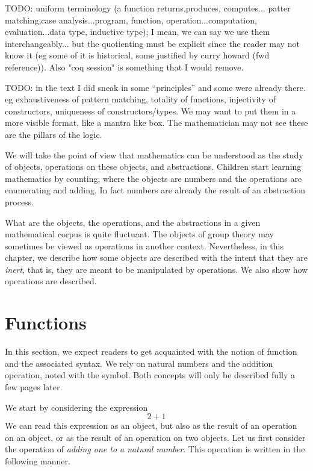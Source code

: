 \label{ch:prog}

TODO: uniform terminology (a function returns,produces, computes... patter matching,case analysis...program, function, operation...computation, evaluation...data type, inductive type); I mean, we can say we use them interchangeably... but the quotienting must be explicit since the reader may not know it (eg some of it is historical, some justified by curry howard (fwd reference)).  Also "coq session" is something that I would remove.

TODO: in the text I did sneak in some ``principles'' and some were already there.  eg exhaustiveness of pattern matching, totality of functions, injectivity of constructors, uniqueness of constructors/types.  We may want to put them in a more visible format, like a mantra like box.  The mathematician may not see these are the pillars of the logic.


We will take the point of view that mathematics can be understood as
the study of objects, operations on these objects, and abstractions.  
Children start learning mathematics by counting, where the objects are
numbers and the operations are enumerating and adding.  In fact
numbers are already the result of an abstraction process.

What are the objects, the operations, and the abstractions in a given
mathematical corpus is quite fluctuant.  The objects of group theory
may sometimes be viewed as operations in another context.  Nevertheless,
in this chapter, we describe how some objects are described with the intent
that they are {\em inert}, that is, they are meant to be
manipulated by operations.  We also show how operations are described.

\section{Functions}
In this section, we expect readers to get acquainted with the notion
of function and the associated syntax.  We rely on natural
numbers and the addition operation, noted with the \C{+} symbol.
Both concepts will only be described fully a few pages later.

We start by considering the expression
\[ 2 + 1 \]
We can read this expression as an object, but also as the result of an
operation on an object, or as the result of an operation on two
objects.  Let us first consider the operation of {\em adding one to
a natural number}.  This operation is written in the following manner.

